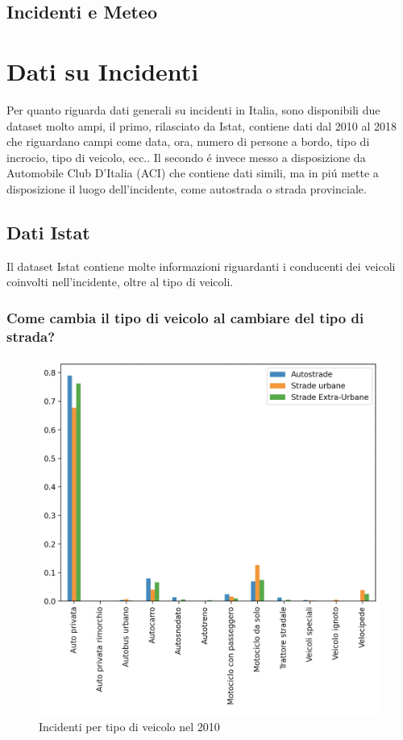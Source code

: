 \documentclass[a4paper]{report}
\begin{document}
\newpage
\section{Incidenti e Meteo}

\newpage
\chapter{Dati su Incidenti}

Per quanto riguarda dati generali su incidenti in Italia, sono disponibili due dataset molto ampi, 
il primo, rilasciato da Istat, contiene dati dal 2010 al 2018 che riguardano campi come data, ora, 
numero di persone a bordo, tipo di incrocio, tipo di veicolo, ecc..
Il secondo \'e invece messo a disposizione da Automobile Club D'Italia (ACI) che contiene dati simili, 
ma in pi\'u mette a disposizione il luogo dell'incidente, come autostrada o strada provinciale.

\newpage
\section{Dati Istat}

Il dataset Istat contiene molte informazioni riguardanti i conducenti dei veicoli coinvolti 
nell'incidente, oltre al tipo di veicoli.

\newpage
\subsection{Come cambia il tipo di veicolo al cambiare del tipo di strada?}

\begin{figure}[!ht]
    \includegraphics[width=\linewidth]{../src/incidenti/incidenti_senza_coords/tipo_veicoli/differenza_strade.png}
    \caption{Incidenti per tipo di veicolo nel 2010}
    \label{fig:differenza_strade}
\end{figure}
\end{document}
